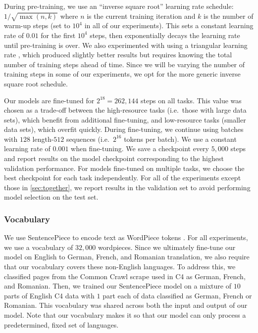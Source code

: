 During pre-training, we use an ``inverse square root'' learning rate schedule: $1 \big/ \sqrt{\max(n, k)}$ where $n$ is the current training iteration and $k$ is the number of warm-up steps (set to $10^{4}$ in all of our experiments). This sets a constant learning rate of $0.01$ for the first $10^{4}$ steps, then exponentially decays the learning rate until pre-training is over. We also experimented with using a triangular learning rate \citep{howard2018universal}, which produced slightly better results but requires knowing the total number of training steps ahead of time. Since we will be varying the number of training steps in some of our experiments, we opt for the more generic inverse square root schedule.

Our models are fine-tuned for $2^{18} = 262{,}144$ steps on all tasks. This value was chosen as a trade-off between the high-resource tasks (i.e.\ those with large data sets), which benefit from additional fine-tuning, and low-resource tasks (smaller data sets), which overfit quickly. During fine-tuning, we continue using batches with $128$ length-$512$ sequences (i.e.\ $2^{16}$ tokens per batch). We use a constant learning rate of $0.001$ when fine-tuning. We save a checkpoint every $5{,}000$ steps and report results on the model checkpoint corresponding to the highest validation performance. For models fine-tuned on multiple tasks, we choose the best checkpoint for each task independently. For all of the experiments except those in \ref{sec:together}, we report results in the validation set to avoid performing model selection on the test set.

\subsubsection{Vocabulary}
We use SentencePiece \citep{kudo2018sentencepiece} to encode text as WordPiece tokens \citep{sennrich2015neural,kudo2018subword}. For all experiments, we use a vocabulary of $32{,}000$ wordpieces. Since we ultimately fine-tune our model on English to German, French, and Romanian translation, we also require that our vocabulary covers these non-English languages. To address this, we classified pages from the Common Crawl scrape used in C4 as German, French, and Romanian. Then, we trained our SentencePiece model on a mixture of $10$ parts of English C4 data with $1$ part each of data classified as German, French or Romanian. This vocabulary was shared across both the input and output of our model. Note that our vocabulary makes it so that our model can only process a predetermined, fixed set of languages.

